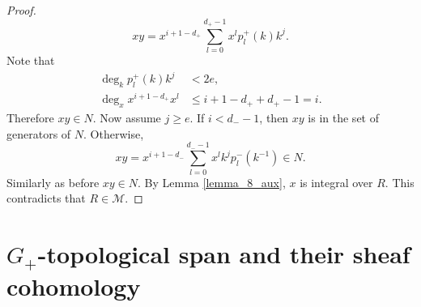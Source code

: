\documentclass[10pt]{article}
\numberwithin{equation}{section}
\theoremstyle{definition}
\begin{document}
\begin{proof}
\begin{equation*}
        xy = x^{i+1-d_+}\sum_{l=0}^{d_+-1}x^lp_l^{+}(k)k^j.
    \end{equation*}
    Note that
    \begin{align*}
        \deg_kp_l^+(k)k^j &<2e,\\
         \deg_x x^{i+1-d_+}x^l  &\leq  i+1-d_++d_+-1 = i.
    \end{align*}
    Therefore $xy\in N$.
    Now assume $j\geq e$. If $i<d_--1$, then $xy$ is in the set of generators of $N$. Otherwise,
    \begin{equation*}
        xy = x^{i+1-d_-}\sum_{l=0}^{d_--1}x^lk^j p_l^{-}(k^{-1})\in N.
    \end{equation*}
    Similarly as before $xy\in N$. By Lemma \ref{lemma_8_aux}, $x$ is integral over $R$. This contradicts that $R\in\mathcal{M}$.
\end{proof}

\section{$G_+$-topological span and their sheaf cohomology}
\end{document}
